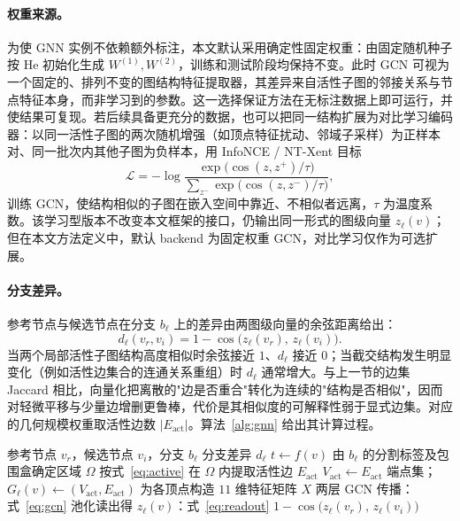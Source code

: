 \documentclass[twocolumn, a4paper, 10pt]{article}
\begin{document}
\paragraph{权重来源。}为使 GNN 实例不依赖额外标注，本文默认采用确定性固定权重：由固定随机种子按 He 初始化生成 $W^{(1)},W^{(2)}$，训练和测试阶段均保持不变。此时 GCN 可视为一个固定的、排列不变的图结构特征提取器，其差异来自活性子图的邻接关系与节点特征本身，而非学习到的参数。这一选择保证方法在无标注数据上即可运行，并使结果可复现。若后续具备更充分的数据，也可以把同一结构扩展为对比学习编码器：以同一活性子图的两次随机增强（如顶点特征扰动、邻域子采样）为正样本对、同一批次内其他子图为负样本，用 InfoNCE / NT-Xent 目标
\begin{equation}
\mathcal{L}=-\log\frac{\exp\bigl(\cos(z,z^{+})/\tau\bigr)}{\sum_{z^{-}}\exp\bigl(\cos(z,z^{-})/\tau\bigr)},
\end{equation}
训练 GCN，使结构相似的子图在嵌入空间中靠近、不相似者远离，$\tau$ 为温度系数。该学习型版本不改变本文框架的接口，仍输出同一形式的图级向量 $z_\ell(v)$；但在本文方法定义中，默认 backend 为固定权重 GCN，对比学习仅作为可选扩展。

\paragraph{分支差异。}参考节点与候选节点在分支 $b_\ell$ 上的差异由两图级向量的余弦距离给出：
\begin{equation}
d_\ell(v_r,v_i)=1-\cos\bigl(z_\ell(v_r),\,z_\ell(v_i)\bigr).
\label{eq:gnndist}
\end{equation}
当两个局部活性子图结构高度相似时余弦接近 $1$、$d_\ell$ 接近 $0$；当截交结构发生明显变化（例如活性边集合的连通关系重组）时 $d_\ell$ 通常增大。与上一节的边集 Jaccard 相比，向量化把离散的"边是否重合"转化为连续的"结构是否相似"，因而对轻微平移与少量边增删更鲁棒，代价是其相似度的可解释性弱于显式边集。对应的几何规模权重取活性边数 $|E_{\mathrm{act}}|$。算法~\ref{alg:gnn} 给出其计算过程。

\begin{algorithm}[H]
\caption{\textsc{BranchDiff} 的 GNN 实例}
\label{alg:gnn}
\begin{algorithmic}[1]
\Require 参考节点 $v_r$，候选节点 $v_i$，分支 $b_\ell$
\Ensure 分支差异 $d_\ell$
    \State $t \gets f(v)$
    \State 由 $b_\ell$ 的分割标签及包围盒确定区域 $\Omega$
    \State 按式~\eqref{eq:active} 在 $\Omega$ 内提取活性边 $E_{\mathrm{act}}$
    \State $V_{\mathrm{act}} \gets E_{\mathrm{act}}$ 端点集；\ $G_\ell(v)\!\gets\!(V_{\mathrm{act}},E_{\mathrm{act}})$
    \State 为各顶点构造 $11$ 维特征矩阵 $X$
    \State 两层 GCN 传播：式~\eqref{eq:gcn}
    \State 池化读出得 $z_\ell(v)$：式~\eqref{eq:readout}
  \EndFor
  \State \Return $1-\cos\bigl(z_\ell(v_r),\,z_\ell(v_i)\bigr)$
\EndFunction
\end{algorithmic}
\end{algorithm}
\end{document}
